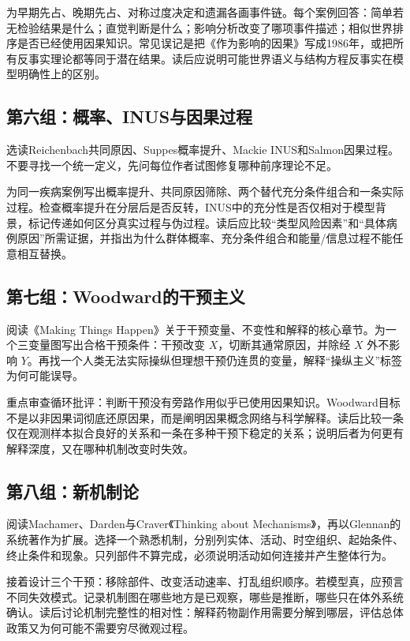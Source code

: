 为早期先占、晚期先占、对称过度决定和遗漏各画事件链。每个案例回答：简单若无检验结果是什么；直觉判断是什么；影响分析改变了哪项事件描述；相似世界排序是否已经使用因果知识。常见误记是把《作为影响的因果》写成1986年，或把所有反事实理论都等同于潜在结果。读后应说明可能世界语义与结构方程反事实在模型明确性上的区别。

\subsection*{第六组：概率、INUS与因果过程}

选读Reichenbach共同原因、Suppes概率提升、Mackie INUS和Salmon因果过程\parencite{reichenbach1956,suppes1970,mackie1974,salmon1984}。不要寻找一个统一定义，先问每位作者试图修复哪种前序理论不足。

为同一疾病案例写出概率提升、共同原因筛除、两个替代充分条件组合和一条实际过程。检查概率提升在分层后是否反转，INUS中的充分性是否仅相对于模型背景，标记传递如何区分真实过程与伪过程。读后应比较“类型风险因素”和“具体病例原因”所需证据，并指出为什么群体概率、充分条件组合和能量/信息过程不能任意相互替换。

\subsection*{第七组：Woodward的干预主义}

阅读《Making Things Happen》关于干预变量、不变性和解释的核心章节\parencite{woodward2003}。为一个三变量图写出合格干预条件：干预改变 $X$，切断其通常原因，并除经 $X$ 外不影响 $Y$。再找一个人类无法实际操纵但理想干预仍连贯的变量，解释“操纵主义”标签为何可能误导。

重点审查循环批评：判断干预没有旁路作用似乎已使用因果知识。Woodward目标不是以非因果词彻底还原因果，而是阐明因果概念网络与科学解释。读后比较一条仅在观测样本拟合良好的关系和一条在多种干预下稳定的关系；说明后者为何更有解释深度，又在哪种机制改变时失效。

\subsection*{第八组：新机制论}

阅读Machamer、Darden与Craver《Thinking about Mechanisms》，再以Glennan的系统著作为扩展\parencite{mdc2000,glennan2017}。选择一个熟悉机制，分别列实体、活动、时空组织、起始条件、终止条件和现象。只列部件不算完成，必须说明活动如何连接并产生整体行为。

接着设计三个干预：移除部件、改变活动速率、打乱组织顺序。若模型真，应预言不同失效模式。记录机制图在哪些地方是已观察，哪些是推断，哪些只在体外系统确认。读后讨论机制完整性的相对性：解释药物副作用需要分解到哪层，评估总体政策又为何可能不需要穷尽微观过程。

